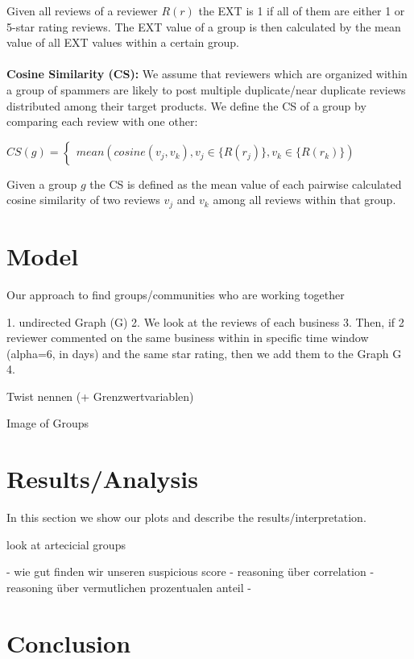 \documentclass[conference]{IEEEtran}  %
\theoremstyle{plain}
\theoremstyle{definition}
\theoremstyle{remark}
\begin{document}
Given all reviews of a reviewer $R(r)$ the EXT is 1 if all of them are either 1 or 5-star rating reviews. The EXT value of a group is then calculated by the mean value of all EXT values within a certain group.  
\\
\\
\textbf{Cosine Similarity (CS):}
We assume that reviewers which are organized within a group of spammers are likely to post multiple duplicate/near duplicate reviews distributed among their target products. We define the CS of a group by comparing each review with one other: 

$
{CS(g)} = \begin{cases}
    mean(cosine(v_j, v_k), v_j \in \{ R(r_j)\},  v_k \in \{ R(r_k)\}) 
\end{cases}
$

Given a group $g$ the CS is defined as the mean value of each pairwise calculated cosine similarity of two reviews $v_j$ and $v_k$ among all reviews within that group. 





 
\section{Model}
\label{sec:model}

Our approach to find groups/communities who are working together

1. undirected Graph (G)
2. We look at the reviews of each business
3. Then, if 2 reviewer commented on the same business within in specific time window (alpha=6, in days) and the same star rating, then we add them to the Graph G 
4. 

Twist nennen (+ Grenzwertvariablen) 

Image of Groups


\section{Results/Analysis}
\label{sec:analysis}

In this section we show our plots and describe the results/interpretation. 

look at artecicial groups

- wie gut finden wir unseren suspicious score
- reasoning über correlation
- reasoning über vermutlichen prozentualen anteil
  - 




\section{Conclusion}
\label{sec:concl}
\end{document}
